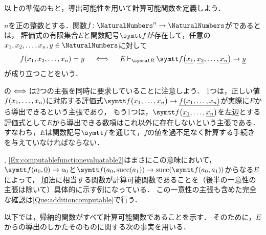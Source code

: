 以上の準備のもと，導出可能性を用いて計算可能関数を定義しよう．

\begin{Def} \label{Def:computablefunction}
	\(n\)を正の整数とする．関数\(f \colon \NaturalNumbers^n \to \NaturalNumbers\)がであるとは，
	評価式の有限集合\(E\)と関数記号\(\obj{f}\)が存在して，任意の\(x_1, x_2, \dots, x_n, y \in \NaturalNumbers\)に対して
	\begin{equation}
		\apply{f}{x_1, x_2, \dots, x_n} = y
		\quad\metaequivalent\quad
		E \evaluatable \apply{\obj{f}}{\numeral{x_1}, \numeral{x_2}, \dots, \numeral{x_n}} \evaluate \numeral{y}
		\label{eq:computablefunction}
	\end{equation}
	が成り立つことをいう．
\end{Def}

の\(\iff\)は2つの主張を同時に要求していることに注意しよう．
1つは，正しい値\(\apply{f}{x_1, \dots, x_n}\)に対応する評価式\(\apply{\obj{f}}{\numeral{x_1}, \dots, \numeral{x_n}} \evaluate \numeral{\apply{f}{x_1, \dots, x_n}}\)が実際に\(E\)から導出できるという主張であり，
もう1つは，\(\apply{\obj{f}}{\numeral{x_1}, \dots, \numeral{x_n}}\)を左辺とする評価式として\(E\)から導出できる数項はこれ以外に存在しないという主張である．
すなわち，\(E\)は関数記号\(\obj{f}\)を通じて，\(f\)の値を過不足なく計算する手続きを与えていなければならない．

, \cref{Ex:computablefunctionevaluatable2}はまさにこの意味において，
\(\apply{\obj{f}}{a_0, \numeral{0}} \evaluate a_0\)と\(\apply{\obj{f}}{a_0, \apply{\succfunc}{a_1}} \evaluate \apply{\succfunc}{\apply{\obj{f}}{a_0, a_1}}\)からなる\(E\)によって，
加法に相当する関数が計算可能関数であることを（後半の一意性の主張は除いて）具体的に示す例になっている．
この一意性の主張も含めた完全な確認は\cref{Que:additioncomputable}で行う．

以下では，帰納的関数がすべて計算可能関数であることを示す．
そのために，\(E\)からの導出のしかたそのものに関する次の事実を用いる．


